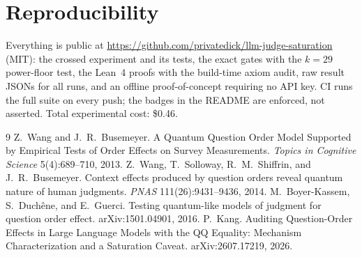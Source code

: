 \documentclass[11pt]{article}
\begin{document}
\section{Reproducibility}

Everything is public at
\url{https://github.com/privatedick/llm-judge-saturation} (MIT): the crossed
experiment and its tests, the exact gates with the $k{=}29$ power-floor
test, the Lean~4 proofs with the build-time axiom audit, raw result JSONs
for all runs, and an offline proof-of-concept requiring no API key. CI runs
the full suite on every push; the badges in the README are enforced, not
asserted. Total experimental cost: \$0.46.

\begin{thebibliography}{9}
 Z.~Wang and J.~R.~Busemeyer. A Quantum Question Order
Model Supported by Empirical Tests of Order Effects on Survey Measurements.
\emph{Topics in Cognitive Science} 5(4):689--710, 2013.
 Z.~Wang, T.~Solloway, R.~M.~Shiffrin, and J.~R.~Busemeyer.
Context effects produced by question orders reveal quantum nature of human
judgments. \emph{PNAS} 111(26):9431--9436, 2014.
 M.~Boyer-Kassem, S.~Duch\^ene, and E.~Guerci.
Testing quantum-like models of judgment for question order effect.
arXiv:1501.04901, 2016.
 P.~Kang. Auditing Question-Order Effects in Large
Language Models with the QQ Equality: Mechanism Characterization and a
Saturation Caveat. arXiv:2607.17219, 2026.
\end{thebibliography}
\end{document}
